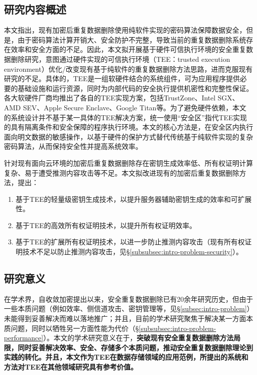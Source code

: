 \subsection{研究内容概述}
\label{subsec:intro-content}

本文指出，现有加密后重复数据删除使用纯软件实现的密码算法保障数据安全，但是，由于密码算法计算开销大、安全防护不完整，导致当前的重复数据删除系统存在效率和安全方面的不足。因此，本文拟开展基于硬件可信执行环境的安全重复数据删除研究，意图通过硬件实现的可信执行环境（TEE：trusted execution environment）优化/改变现有基于纯软件的重复数据删除方法思路，进而克服现有研究的不足。具体的，TEE是一组软硬件结合的系统组件，可为应用程序提供必要的基础设施和运行资源，同时为内部代码的安全执行提供机密性和完整性保证\cite{OMTP}。各大软硬件厂商均推出了各自的TEE实现方案，包括TrustZone\cite{trustzone}、Intel SGX\cite{sgx,sgx2}、AMD SEV\cite{AMDSEV}、Apple Secure Enclave\cite{AppleSecureEnclave}、Google Titan\cite{GoogleTitan}等。为了避免硬件依赖，本文的系统设计并不基于某一具体的TEE解决方案，统一使用“安全区”指代TEE实现的具有隔离条件和安全保障的程序执行环境。本文的核心方法是，在安全区内执行面向明文数据的敏感操作，以基于硬件的保护方式替代传统基于纯软件实现的复杂密码算法，从而保持安全性并提高系统效率。

针对现有面向云环境的加密后重复数据删除存在密钥生成效率低、所有权证明计算复杂、易于遭受推测内容攻击等不足。本文拟改进现有的加密后重复数据删除方法，提出：

\begin{enumerate}[leftmargin=*]
    \item 基于TEE的轻量级密钥生成技术，以提升服务器辅助密钥生成的效率和可扩展性。
    \item 基于TEE的高效所有权证明技术，以提升所有权证明效率。
    \item 基于TEE的扩展所有权证明技术，以进一步防止推测内容攻击（现有所有权证明技术不足以防止推测内容攻击，见\S\ref{subsubsec:intro-problem-security}）。
\end{enumerate}

\subsection{研究意义}
\label{subsec:intro-meaning}

在学术界，自收敛加密\cite{douceur2002reclaiming}提出以来，安全重复数据删除已有20余年研究历史，但由于一些本质问题（例如效率、侧信道攻击、密钥管理等，见\S\ref{subsec:intro-problem}）未能得到妥善解决而难以落地推广；并且，目前的学术研究聚焦于解决某一方面本质问题，同时以牺牲另一方面性能为代价（\S\ref{subsubsec:intro-problem-performance}）。本文的学术研究意义在于，\textbf{突破现有安全重复数据删除方法局限，同时妥善解决效率、安全、存储多个本质问题，推动安全重复数据删除理论到实践的转化。并且，本文作为TEE在数据存储领域的应用范例，所提出的系统和方法对TEE在其他领域研究具有参考价值。}

